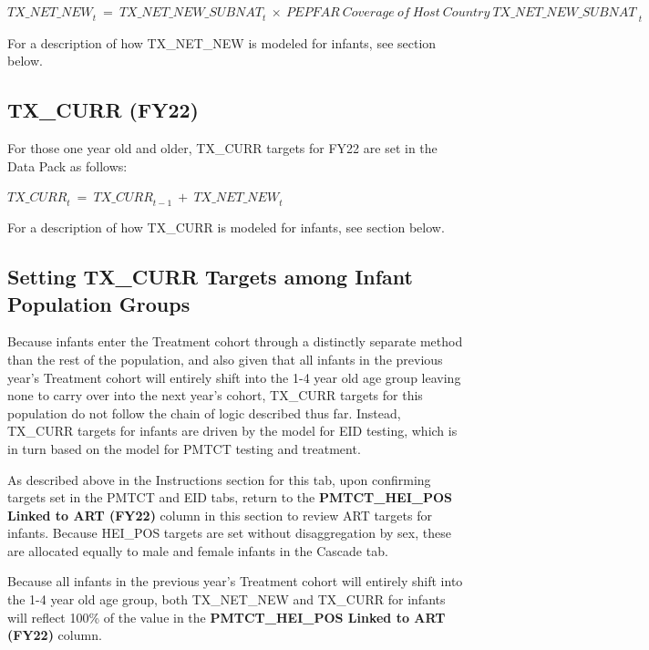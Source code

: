\documentclass[
  openany]{book}
\begin{document}
\begin{center} ${TX\_ NET\_ NEW}_{t}\  = \ {TX\_ NET\_ NEW\_ SUBNAT}_{t}\  \times \ {PEPFAR\ Coverage\ of\ Host\ Country\ TX\_ NET\_ NEW\_ SUBNAT\ }_{t}\ $ \end{center}

For a description of how TX\_NET\_NEW is modeled for infants, see section
below.

\hypertarget{tx_curr-fy22}{%
\subsection{TX\_CURR (FY22)}\label{tx_curr-fy22}}

For those one year old and older, TX\_CURR targets for FY22 are set in
the Data Pack as follows:

\begin{center} ${TX\_ CURR}_{t}\  = \ {TX\_ CURR}_{t - 1}\  + \ {TX\_ NET\_ NEW}_{t}$ \end{center}

For a description of how TX\_CURR is modeled for infants, see section
below.

\hypertarget{setting-tx_curr-targets-among-infant-population-groups}{%
\subsection{Setting TX\_CURR Targets among Infant Population Groups}\label{setting-tx_curr-targets-among-infant-population-groups}}

Because infants enter the Treatment cohort through a distinctly separate
method than the rest of the population, and also given that all infants
in the previous year's Treatment cohort will entirely shift into the 1-4
year old age group leaving none to carry over into the next year's
cohort, TX\_CURR targets for this population do not follow the chain of
logic described thus far. Instead, TX\_CURR targets for infants are
driven by the model for EID testing, which is in turn based on the model
for PMTCT testing and treatment.

As described above in the Instructions section for this tab, upon
confirming targets set in the PMTCT and EID tabs, return to the
\textbf{PMTCT\_HEI\_POS Linked to ART (FY22)} column in this section to review
ART targets for infants. Because HEI\_POS targets are set without
disaggregation by sex, these are allocated equally to male and female
infants in the Cascade tab.

Because all infants in the previous year's Treatment cohort will
entirely shift into the 1-4 year old age group, both TX\_NET\_NEW and
TX\_CURR for infants will reflect 100\% of the value in the
\textbf{PMTCT\_HEI\_POS Linked to ART (FY22)} column.
\end{document}
